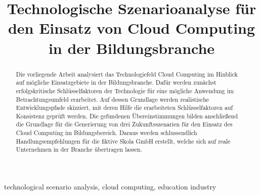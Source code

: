 \documentclass[conference]{IEEEtran}
\begin{document}
\title{Technologische Szenarioanalyse für den Einsatz von Cloud Computing in der Bildungsbranche}

\author{
}

\maketitle

\begin{abstract}
Die vorliegende Arbeit analysiert das Technologiefeld Cloud Computing im Hinblick auf mögliche Einsatzgebiete in der Bildungsbranche. Dafür werden zunächst erfolgskritische Schlüsselfaktoren der Technologie für eine mögliche Anwendung im Betrachtungsumfeld erarbeitet. Auf dessen Grundlage werden realistische Entwicklungspfade skizziert, mit deren Hilfe die erarbeiteten Schlüsselfaktoren auf Konsistenz geprüft werden. Die gefundenen Übereinstimmungen bilden anschließend die Grundlage für die Generierung von drei Zukunftsszenarien für den Einsatz des Cloud Computing im Bildungsbereich. Daraus werden schlussendlich Handlungsempfehlungen für die fiktive Skola GmbH erstellt, welche sich auf reale Unternehmen in der Branche übertragen lassen.
\end{abstract}

\begin{IEEEkeywords}
technological scenario analysis, cloud computing, education industry
\end{IEEEkeywords}

\end{document}
